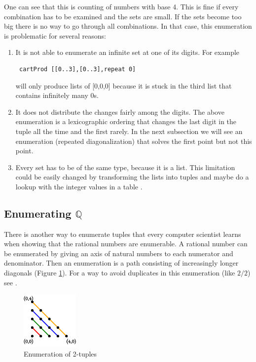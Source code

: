 \documentclass{tmr}
\newcommand{\authornote}[3]{{\color{#2} {\sc #1}: #3}}
\newcommand\bay[1]{\authornote{edward}{blue}{#1}}
\begin{document}
One can see that this is counting of numbers with base 4.
This is fine if every combination has to be examined and the sets are small. If the sets become too big there is no way to go through all combinations. %
In that case, this enumeration is problematic for several reasons:
\begin{enumerate}
\item It is not able to enumerate an infinite set at one of its digits. For example \begin{verbatim} cartProd [[0..3],[0..3],repeat 0] \end{verbatim} will only produce lists of [0,0,0] because it is stuck in the third list that contains infinitely many 0s. %
\item It does not distribute the changes fairly among the digits. The above enumeration is a lexicographic ordering that changes the last digit in the tuple all the time and the first rarely. In the next subsection we will see an enumeration (repeated diagonalization) that solves the first point but not this point.
\item Every set has to be of the same type, because it is a list. This limitation could be easily changed by transforming the lists into tuples and maybe do a lookup with the integer values in a table . %
\end{enumerate}

\subsection{Enumerating $\mathbb{Q} $}
There is another way to enumerate tuples that every computer scientist learns when showing that the rational numbers are enumerable. A rational number can be enumerated by giving an axis of natural numbers to each numerator and denominator. Then an enumeration is a path consisting of increasingly longer diagonals (Figure \ref{enum2}). For a way to avoid duplicates in this enumeration (like $2/2$) see \cite{rationals}.

\begin{figure}[htbp]
  \centering
     \includegraphics[width=0.25\textwidth]{enum2c.pdf}
  \caption{Enumeration of 2-tuples}
  \label{enum2}
\end{figure}
\end{document}

